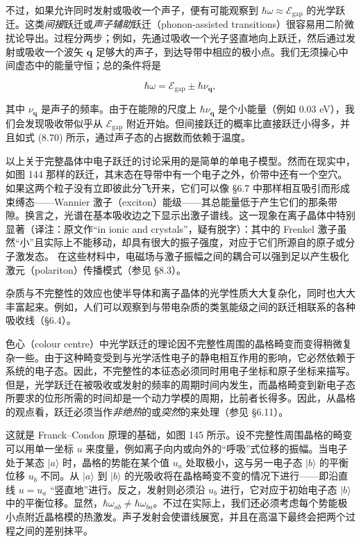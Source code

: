 不过，如果允许同时发射或吸收一个声子，便有可能观察到 $\hbar\omega\approx\mathcal{E}_{\mathrm{gap}}$ 的光学跃迁。这类\emph{间接}跃迁或\emph{声子辅助}跃迁（phonon-assisted transitions）很容易用二阶微扰论导出。过程分两步；例如，先通过吸收一个光子竖直地向上跃迁，然后通过发射或吸收一个波矢 $\mathbf{q}$ 足够大的声子，到达导带中相应的极小点。我们无须操心中间虚态中的能量守恒；总的条件将是

\begin{equation*}
\hbar\omega = \mathcal{E}_{\mathrm{gap}} \pm \hbar\nu_{\mathbf{q}},
\tag{8.75}
\end{equation*}

其中 $\nu_{\mathbf{q}}$ 是声子的频率。由于在能隙的尺度上 $\hbar\nu_{\mathbf{q}}$ 是个小能量（例如 0.03 eV），我们会发现吸收带似乎从 $\mathcal{E}_{\mathrm{gap}}$ 附近开始。但间接跃迁的概率比直接跃迁小得多，并且如式 (8.70) 所示，通过声子态的占据数而依赖于温度。

以上关于完整晶体中电子跃迁的讨论采用的是简单的单电子模型。然而在现实中，如图 144 那样的跃迁，其末态在导带中有一个电子之外，价带中还有一个空穴。如果这两个粒子没有立即彼此分飞开来，它们可以像 §6.7 中那样相互吸引而形成束缚态——Wannier 激子（exciton）能级——其总能量低于产生它们的那条带隙。换言之，光谱在基本吸收边之下显示出激子谱线。这一现象在离子晶体中特别显著（译注：原文作“in ionic and crystals”，疑有脱字）：其中的 Frenkel 激子虽然“小”且实际上不能移动，却具有很大的振子强度，对应于它们所源自的原子或分子激发态。
在这些材料中，电磁场与激子振幅之间的耦合可以强到足以产生极化激元（polariton）传播模式（参见 §8.3）。

杂质与不完整性的效应也使半导体和离子晶体的光学性质大大复杂化，同时也大大丰富起来。例如，人们可以观察到与带电杂质的类氢能级之间的跃迁相联系的各种吸收线（§6.4）。

色心（colour centre）中光学跃迁的理论因不完整性周围的晶格畸变而变得稍微复杂一些。由于这种畸变受到与光学活性电子的静电相互作用的影响，它必然依赖于系统的电子态。因此，不完整性的本征态必须同时用电子坐标和原子坐标来描写。但是，光学跃迁在被吸收或发射的频率的周期时间内发生，而晶格畸变到新电子态所要求的位形所需的时间却是一个动力学模的周期，比前者长得多。因此，从晶格的观点看，跃迁必须当作\emph{非绝热}的或\emph{突然}的来处理（参见 §6.11）。

这就是 Franck–Condon 原理的基础，如图 145 所示。设不完整性周围晶格的畸变可以用单一坐标 $u$ 来度量，例如离子向内或向外的“呼吸”式位移的振幅。当电子处于某态 $|a\rangle$ 时，晶格的势能在某个值 $u_a$ 处取极小，这与另一电子态 $|b\rangle$ 的平衡位移 $u_b$ 不同。从 $|a\rangle$ 到 $|b\rangle$ 的光吸收将在晶格畸变不变的情况下进行——即沿直线 $u=u_a$ “竖直地”进行。反之，发射则必须沿 $u_b$ 进行，它对应于初始电子态 $|b\rangle$ 中的平衡位移。显然，$\hbar\omega_{ab}\neq\hbar\omega_{ba}$。不过在实际上，我们还必须考虑每个势能极小点附近晶格模的热激发。声子发射会使谱线展宽，并且在高温下最终会把两个过程之间的差别抹平。


